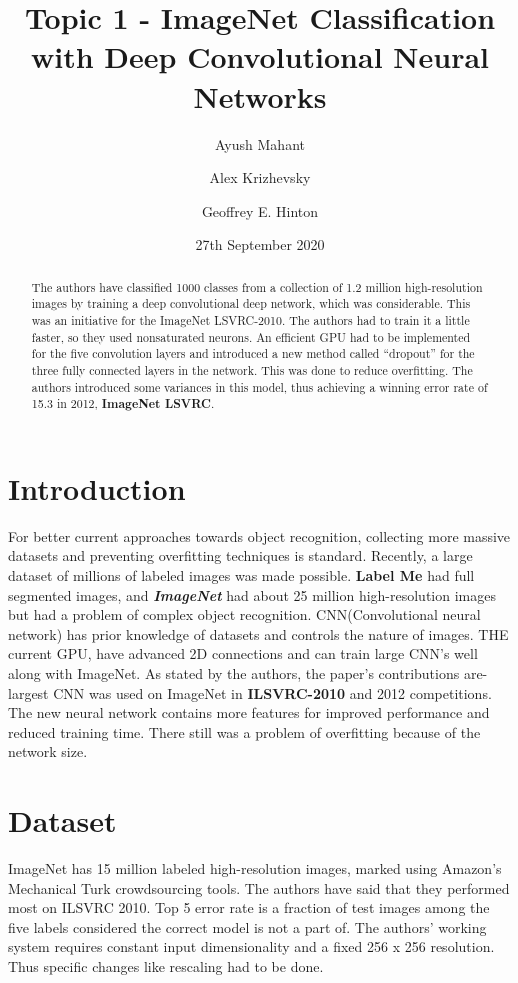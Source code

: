 \documentclass{article}
\begin{document}
\title{Topic 1 - ImageNet Classification with Deep Convolutional Neural Networks\cite{krizhevsky2012imagenet}}
\author[1]{Ayush Mahant}
\author[2]{Alex Krizhevsky}
\author[2]{Geoffrey E. Hinton}

\date{27th September 2020}
\maketitle
\begin{abstract}
 The authors have classified 1000 classes from a collection of 1.2 million high-resolution images by training a deep convolutional deep network, which was considerable. This was an initiative for the ImageNet LSVRC-2010. The authors had to train it a little faster, so they used nonsaturated neurons. An efficient GPU had to be implemented for the five convolution layers and introduced a new method called “dropout” for the three fully connected layers in the network. This was done to reduce overfitting. The authors introduced some variances in this model, thus achieving a winning error rate of 15.3 in 2012, \textbf{ImageNet LSVRC}.

  
  
 
\end{abstract}


\section{Introduction}
For better current approaches towards object recognition, collecting more massive datasets and preventing overfitting techniques is standard.   Recently, a large dataset of millions of labeled images was made possible. \textbf{Label Me}\cite{russell2008labelme} had full segmented images, and \textbf{\emph{ImageNet}}\cite{deng2009imagenet} had about 25 million high-resolution images but had a problem of complex object recognition. CNN(Convolutional neural network) has prior knowledge of datasets and controls the nature of images. THE current GPU, have advanced 2D connections and can train large CNN's well along with ImageNet. As stated by the authors, the paper's contributions are- largest CNN was used on ImageNet in \textbf{ILSVRC-2010} and 2012 competitions\cite{berg2010large}. The new neural network contains more features for improved performance and reduced training time. There still was a problem of overfitting because of the network size.

\section{Dataset}
ImageNet has 15 million labeled high-resolution images, marked using Amazon's Mechanical Turk crowdsourcing tools. The authors have said that they performed most on ILSVRC 2010. Top 5 error rate is a fraction of test images among the five labels considered the correct model is not a part of. The authors' working system requires constant input dimensionality and a fixed 256 x 256 resolution. Thus specific changes like rescaling had to be done. 
\end{document}
